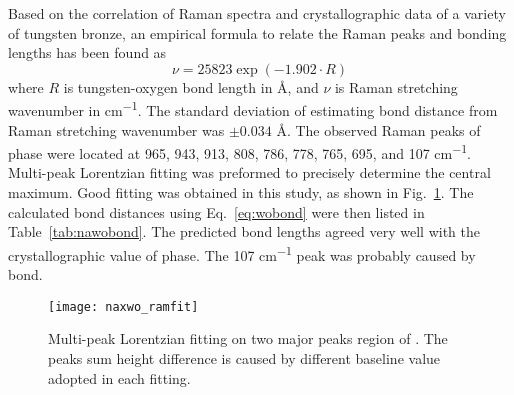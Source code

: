 Based on the correlation of Raman spectra and crystallographic data of a variety of tungsten bronze, an empirical formula to relate the Raman peaks and  bonding lengths has been found as
\begin{equation}\label{eq:wobond}
\nu = 25823 \exp(-1.902\cdot R)
\end{equation}
where $R$ is tungsten-oxygen bond length in \si{\angstrom}, and $\nu$ is Raman stretching wavenumber in \si{cm^{-1}}.\cite{Hardcastle1995} The standard deviation of estimating  bond distance from Raman stretching wavenumber was $\pm 0.034$ \si{\angstrom}. The observed Raman peaks of  phase were located at 965, 943, 913, 808, 786, 778, 765, 695, and 107 \si{cm^{-1}}. Multi-peak Lorentzian fitting was preformed to precisely determine the central maximum. Good fitting was obtained in this study, as shown in Fig.~\ref{fig:naworamfit}. The calculated  bond distances using Eq.~\ref{eq:wobond} were then listed in Table~\ref{tab:nawobond}. The predicted  bond lengths agreed very well with the crystallographic value of  phase.\cite{Triantafyllou1999a} The 107 \si{cm^{-1}} peak was probably caused by  bond.
\begin{figure}[htb]
\centering
\texttt{[image: naxwo\_ramfit]}
\caption[Multi-peak Lorentzian fitting on ]{Multi-peak Lorentzian fitting on two major peaks region of . The peaks sum height difference is caused by different baseline value adopted in each fitting.}
\label{fig:naworamfit}
\end{figure}

